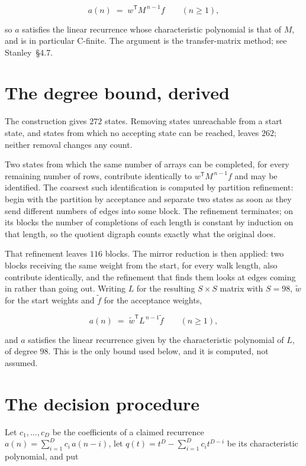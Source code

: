 \documentclass[11pt]{article}
\theoremstyle{definition}
\begin{document}
\[a(n) \;=\; w^{\mathsf T} M^{\,n-1} f \qquad (n \ge 1),\]

so $a$ satisfies the linear recurrence whose characteristic polynomial is that of $M$, and is in particular C-finite. The argument is the transfer-matrix method; see Stanley~\S4.7.

\section{The degree bound, derived}

The construction gives $272$ states. Removing states unreachable from a start state, and states from which no accepting state can be reached, leaves $262$; neither removal changes any count.

Two states from which the same number of arrays can be completed, for every remaining number of rows, contribute identically to $w^{\mathsf T}M^{\,n-1}f$ and may be identified. The coarsest such identification is computed by partition refinement: begin with the partition by acceptance and separate two states as soon as they send different numbers of edges into some block. The refinement terminates; on its blocks the number of completions of each length is constant by induction on that length, so the quotient digraph counts exactly what the original does.

That refinement leaves $116$ blocks. The mirror reduction is then applied: two blocks receiving the same weight from the start, for every walk length, also contribute identically, and the refinement that finds them looks at edges coming in rather than going out. Writing $L$ for the resulting $S \times S$ matrix with $S = 98$, $\tilde w$ for the start weights and $\tilde f$ for the acceptance weights,

\[a(n) \;=\; \tilde w^{\mathsf T} L^{\,n-1} \tilde f \qquad (n \ge 1),\]

and $a$ satisfies the linear recurrence given by the characteristic polynomial of $L$, of degree $98$. This is the only bound used below, and it is computed, not assumed.

\section{The decision procedure}

Let $c_1,\dots,c_D$ be the coefficients of a claimed recurrence $a(n) = \sum_{i=1}^{D} c_i\,a(n-i)$, let $q(t) = t^{D} - \sum_{i=1}^{D} c_i t^{D-i}$ be its characteristic polynomial, and put
\end{document}
